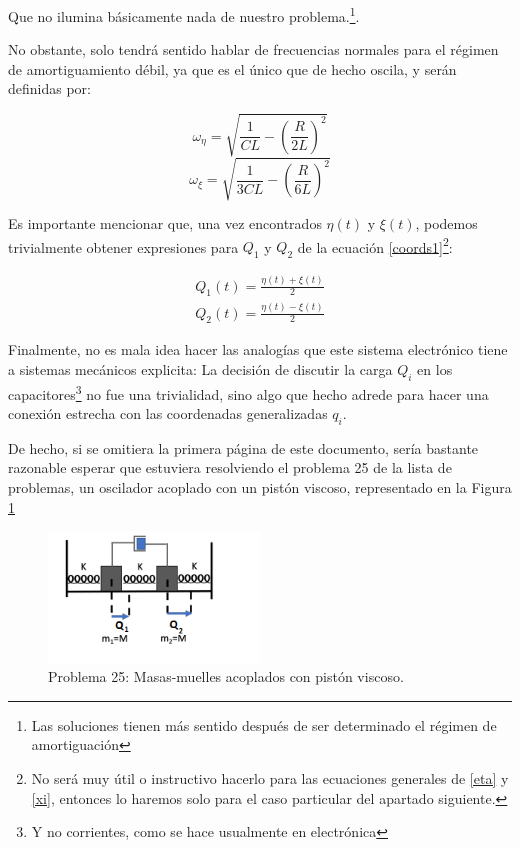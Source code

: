 \documentclass[a4paper,12pt]{article}
\begin{document}
Que no ilumina básicamente nada de nuestro problema.\footnote{Las soluciones tienen más sentido después de ser determinado el régimen de amortiguación}. 

No obstante, solo tendrá sentido hablar de frecuencias normales para el régimen de amortiguamiento débil, ya que es el único que de hecho oscila, y serán definidas por:

\begin{equation}
  \label{eta}
  \omega_{\eta} = \sqrt{\frac{1}{CL} - \left(\frac{R}{2L}\right)^2}
\end{equation}
\begin{equation}
  \label{xi}
  \omega_{\xi} = \sqrt{\frac{1}{3CL} - \left(\frac{R}{6L}\right)^2}
\end{equation}

Es importante mencionar que, una vez encontrados $\eta(t)$ y $\xi(t)$, podemos trivialmente obtener expresiones para $Q_{1}$ y $Q_2$ de la ecuación \eqref{coords1}\footnote{No será muy útil o instructivo hacerlo para las ecuaciones generales de \eqref{eta} y \eqref{xi}, entonces lo haremos solo para el caso particular del apartado siguiente.}:

\begin{equation}
  \begin{aligned}
    Q_1(t) = \frac{\eta(t) + \xi(t)}{2}\\
    Q_2(t) = \frac{\eta(t) - \xi(t)}{2} 
  \end{aligned}
\end{equation}

Finalmente, no es mala idea hacer las analogías que este sistema electrónico tiene a sistemas mecánicos explicita: La decisión de discutir la carga $Q_{i}$ en los capacitores\footnote{Y no corrientes, como se hace usualmente en electrónica} no fue una trivialidad, sino algo que hecho adrede para hacer una conexión estrecha con las coordenadas generalizadas $q_i$. 

De hecho, si se omitiera la primera página de este documento, sería bastante razonable esperar que estuviera resolviendo el problema 25 de la lista de problemas, un oscilador acoplado con un pistón viscoso, representado en la Figura \ref{amort}
\begin{figure}
  \centering
  \caption{Problema 25: Masas-muelles acoplados con pistón viscoso.}
  \label{amort}
  \includegraphics[width=0.5\textwidth]{amort.jpg}
\end{figure}
\end{document}
